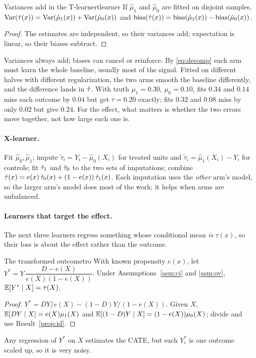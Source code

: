 \documentclass[11pt]{article}
\begin{document}
\begin{prop}{Variances add in the T-learner}{tlearner}
If $\hat\mu_1$ and $\hat\mu_0$ are fitted on disjoint samples,
$\operatorname{Var}(\hat{\tau}(x)) = \operatorname{Var}(\hat\mu_1(x)) + \operatorname{Var}(\hat\mu_0(x))$ and
$\text{bias}(\hat{\tau}(x)) = \text{bias}(\hat\mu_1(x)) - \text{bias}(\hat\mu_0(x))$.
\end{prop}
\begin{proof}
The estimates are independent, so their variances add; expectation is linear, so their biases subtract.
\end{proof}
Variances always add; biases can cancel or reinforce. By \eqref{eq:decomp} each arm must learn the whole
baseline, usually most of the signal. Fitted on different halves with different regularization, the two arms
smooth the baseline differently, and the difference lands in $\hat{\tau}$. With truth $\mu_1 = 0.30$, $\mu_0 = 0.10$,
fits $0.34$ and $0.14$ miss each outcome by $0.04$ but get $\tau = 0.20$ exactly; fits $0.32$ and $0.08$ miss by
only $0.02$ but give $0.24$. For the effect, what matters is whether the two errors move together, not how
large each one is.

\paragraph{X-learner.} Fit $\hat\mu_0, \hat\mu_1$; impute $\tilde\tau_i = Y_i - \hat\mu_0(X_i)$ for treated units and
$\tilde\tau_i = \hat\mu_1(X_i) - Y_i$ for controls; fit $\hat{\tau}_1$ and $\hat{\tau}_0$ to the two sets of imputations; combine
$\hat{\tau}(x) = e(x)\,\hat{\tau}_0(x) + (1 - e(x))\,\hat{\tau}_1(x)$. Each imputation uses the \emph{other} arm's model, so the
larger arm's model does most of the work; it helps when arms are unbalanced.

\paragraph{Learners that target the effect.} The next three learners regress something whose conditional
mean \emph{is} $\tau(x)$, so their loss is about the effect rather than the outcome.

\begin{prop}{The transformed outcome}{tro}
With known propensity $e(x)$, let $Y^\ast = Y\,\dfrac{D - e(X)}{e(X)(1-e(X))}$. Under Assumptions~\ref{asm:ci}
and \ref{asm:ov}, $\mathbb{E}[Y^\ast \mid X] = \tau(X)$.
\end{prop}
\begin{proof}
$Y^\ast = DY/e(X) - (1-D)Y/(1-e(X))$. Given $X$, $\mathbb{E}[DY \mid X] = e(X)\mu_1(X)$ and
$\mathbb{E}[(1-D)Y \mid X] = (1-e(X))\mu_0(X)$; divide and use Result~\ref{prop:id}.
\end{proof}
Any regression of $Y^\ast$ on $X$ estimates the CATE, but each $Y^\ast_i$ is one outcome scaled up, so it is very
noisy.
\end{document}
